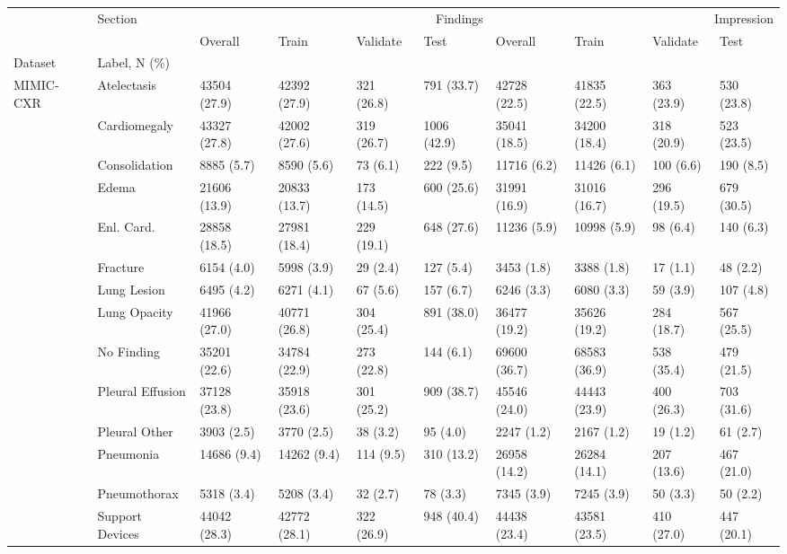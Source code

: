 \begin{tabular}{llllllllll}
\toprule
 & Section & \multicolumn{4}{r}{Findings} & \multicolumn{4}{r}{Impression} \\
 &  & Overall & Train & Validate & Test & Overall & Train & Validate & Test \\
Dataset & Label, N (\%) &  &  &  &  &  &  &  &  \\
\midrule
\multirow[c]{15}{*}{MIMIC-CXR} & Atelectasis & 43504 (27.9) & 42392 (27.9) & 321 (26.8) & 791 (33.7) & 42728 (22.5) & 41835 (22.5) & 363 (23.9) & 530 (23.8) \\
 & Cardiomegaly & 43327 (27.8) & 42002 (27.6) & 319 (26.7) & 1006 (42.9) & 35041 (18.5) & 34200 (18.4) & 318 (20.9) & 523 (23.5) \\
 & Consolidation & 8885 (5.7) & 8590 (5.6) & 73 (6.1) & 222 (9.5) & 11716 (6.2) & 11426 (6.1) & 100 (6.6) & 190 (8.5) \\
 & Edema & 21606 (13.9) & 20833 (13.7) & 173 (14.5) & 600 (25.6) & 31991 (16.9) & 31016 (16.7) & 296 (19.5) & 679 (30.5) \\
 & Enl. Card. & 28858 (18.5) & 27981 (18.4) & 229 (19.1) & 648 (27.6) & 11236 (5.9) & 10998 (5.9) & 98 (6.4) & 140 (6.3) \\
 & Fracture & 6154 (4.0) & 5998 (3.9) & 29 (2.4) & 127 (5.4) & 3453 (1.8) & 3388 (1.8) & 17 (1.1) & 48 (2.2) \\
 & Lung Lesion & 6495 (4.2) & 6271 (4.1) & 67 (5.6) & 157 (6.7) & 6246 (3.3) & 6080 (3.3) & 59 (3.9) & 107 (4.8) \\
 & Lung Opacity & 41966 (27.0) & 40771 (26.8) & 304 (25.4) & 891 (38.0) & 36477 (19.2) & 35626 (19.2) & 284 (18.7) & 567 (25.5) \\
 & No Finding & 35201 (22.6) & 34784 (22.9) & 273 (22.8) & 144 (6.1) & 69600 (36.7) & 68583 (36.9) & 538 (35.4) & 479 (21.5) \\
 & Pleural Effusion & 37128 (23.8) & 35918 (23.6) & 301 (25.2) & 909 (38.7) & 45546 (24.0) & 44443 (23.9) & 400 (26.3) & 703 (31.6) \\
 & Pleural Other & 3903 (2.5) & 3770 (2.5) & 38 (3.2) & 95 (4.0) & 2247 (1.2) & 2167 (1.2) & 19 (1.2) & 61 (2.7) \\
 & Pneumonia & 14686 (9.4) & 14262 (9.4) & 114 (9.5) & 310 (13.2) & 26958 (14.2) & 26284 (14.1) & 207 (13.6) & 467 (21.0) \\
 & Pneumothorax & 5318 (3.4) & 5208 (3.4) & 32 (2.7) & 78 (3.3) & 7345 (3.9) & 7245 (3.9) & 50 (3.3) & 50 (2.2) \\
 & Support Devices & 44042 (28.3) & 42772 (28.1) & 322 (26.9) & 948 (40.4) & 44438 (23.4) & 43581 (23.5) & 410 (27.0) & 447 (20.1) \\

\end{tabular}
